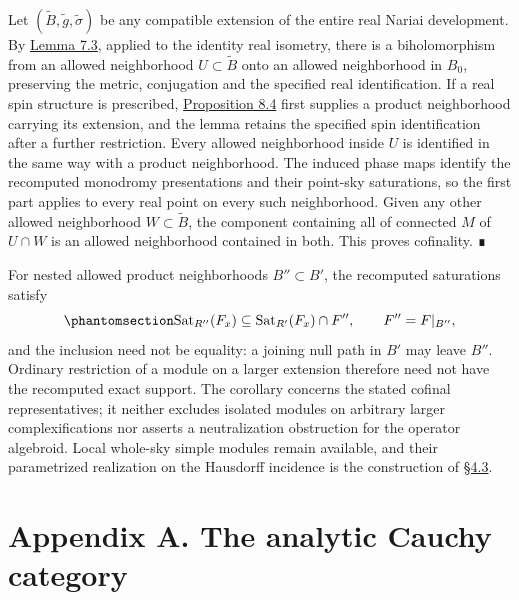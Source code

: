 \documentclass[
  english,
  11pt,
  reqno]{amsart}
\begin{document}
Let \((\widetilde B,\widetilde g,\widetilde\sigma)\) be any compatible
extension of the entire real Nariai development. By
\hyperref[lem:whole-real-isometry-complexification]{Lemma 7.3}, applied
to the identity real isometry, there is a biholomorphism from an allowed
neighborhood \(U\subset\widetilde B\) onto an allowed neighborhood in
\(B_0\), preserving the metric, conjugation and the specified real
identification. If a real spin structure is prescribed,
\hyperref[prop:nariai-restricted-quotient-v08]{Proposition 8.4} first
supplies a product neighborhood carrying its extension, and the lemma
retains the specified spin identification after a further restriction.
Every allowed neighborhood inside \(U\) is identified in the same way
with a product neighborhood. The induced phase maps identify the
recomputed monodromy presentations and their point-sky saturations, so
the first part applies to every real point on every such neighborhood.
Given any other allowed neighborhood \(W\subset\widetilde B\), the
component containing all of connected \(M\) of \(U\cap W\) is an allowed
neighborhood contained in both. This proves cofinality. ∎

For nested allowed product neighborhoods \(B''\subset B'\), the
recomputed saturations satisfy
\begin{equation}\protect\phantomsection\label{eq:nariai-recomputed-saturation-inclusion-v09}{
\operatorname{Sat}_{R''}(F_x)
\subseteq
\operatorname{Sat}_{R'}(F_x)\cap F'',
\qquad F''=F|_{B''},
}\end{equation} and the inclusion need not be equality: a joining null
path in \(B'\) may leave \(B''\). Ordinary restriction of a module on a
larger extension therefore need not have the recomputed exact support.
The corollary concerns the stated cofinal representatives; it neither
excludes isolated modules on arbitrary larger complexifications nor
asserts a neutralization obstruction for the operator algebroid. Local
whole-sky simple modules remain available, and their parametrized
realization on the Hausdorff incidence is the construction of
\hyperref[sec:operator-parametrized-incidence-v08]{§4.3}.

\protect{}\label{sec:analytic-cauchy-appendix-v08}

\section{Appendix A. The analytic Cauchy
category}\label{appendix-a.-the-analytic-cauchy-category}
\end{document}
